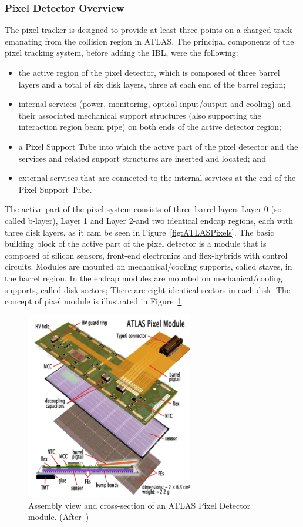 \subsubsection{Pixel Detector Overview}
The pixel tracker is designed to provide at least three points on a charged track emanating from the 
collision region in ATLAS. 
The principal components of the pixel tracking system, before adding the IBL, were the following:
\begin{itemize}
\item the active region of the pixel detector, which is composed of three barrel layers and a total of six disk layers, three at each end of the barrel region;
\item internal services (power, monitoring, optical input/output and cooling) and their associated mechanical support structures (also supporting the interaction region beam pipe) on both ends of the active detector region;
\item a Pixel Support Tube into which the active part of the pixel detector and the services and related support structures are inserted and located; and
\item external services that are connected to the internal services at the end of the Pixel Support Tube.
\end{itemize}

The active part of the pixel system consists of three barrel layers-Layer 0 (so-called b-layer), Layer 1 
and Layer 2-and two identical endcap regions, each with three disk layers, as it cam be seen in 
Figure~\ref{fig:ATLASPixels}. The basic building block of the active part of the pixel detector is a module 
that is composed of silicon sensors, front-end electronics and flex-hybrids with control circuits.
Modules are mounted on mechanical/cooling supports, called staves, in the barrel region. 
In the endcap modules are mounted on mechanical/cooling supports, called disk sectors; There are 
eight identical sectors in each disk. The concept of  pixel module is illustrated in Figure~\ref{fig:Pixel_module}.
\begin{figure}[!htbp]
\centering
\includegraphics[width=0.65\textwidth]{Pixel_module.png}
\caption{\label{fig:Pixel_module}Assembly view and cross-section of an ATLAS Pixel Detector module. (After~\cite{AtlasPixels})}
\end{figure}


